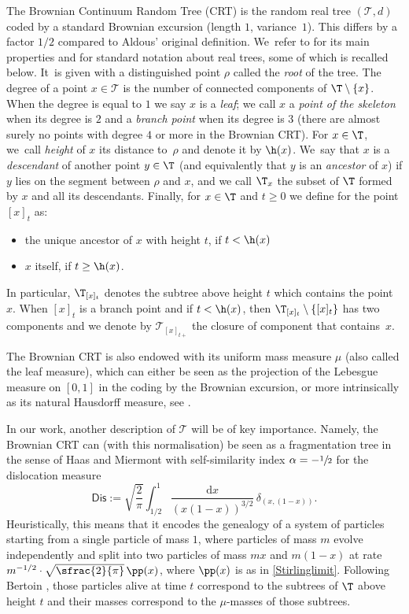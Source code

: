 The Brownian Continuum Random Tree (CRT) is the random real tree $(\mathcal{T}, d)$ coded by a standard Brownian excursion (length $1$, variance~$1$). This differs by a factor $1/2$ compared to Aldous' original definition. We~refer to \cite{LG2005} for its main properties and for standard notation about real trees, some of which is recalled below. It~is given with a distinguished point $ \rho$ called the \emph{root} of the tree. The degree of a point $x \in \mathcal{T}$ is the number of connected components of $\T\setminus \{x\}$. When the degree is equal to $1$ we say $x$ is a \emph{leaf}; we call $x$ a \emph{point of the skeleton} when its degree is $2$ and a \emph{branch point} when its degree is $3$ (there are almost surely no points with degree $4$ or more in the Brownian CRT). For $x\in \T$, we~call \emph{height} of $x$ its distance to~$\rho$ and denote it by $\h(x)$. We~say that $x$ is a \emph{descendant} of another point $y\in\T$ (and equivalently that $y$ is an \emph{ancestor} of $x$) if $y$ lies on the segment between $\rho$ and $x$, and we call $\T_x$ the subset of $\T$ formed by $x$ and all its descendants. Finally, for $x \in \T$ and $t\geq 0$ we define for the point $[x]_t$ as:
\begin{itemize}
\item the unique ancestor of $x$ with height $t$, if $t< \h(x)$
\item $x$ itself, if $t\geq \h(x)$.
\end{itemize}
In particular, $ \T_{[x]_t}$ denotes the subtree above height $t$ which contains the point $x$. When $[x]_t$ is a branch point and if $t < \h(x)$, then $\T_{[x]_t} \setminus \{[x]_t\}$ has two components and we denote by $ \mathcal{T}_{[x]_{t+}}$ the closure of component that contains~$x$.

The Brownian CRT is also endowed with its uniform mass measure $\mu$ (also called the leaf measure), which can either be seen as the projection of the Lebesgue measure on $[0,1]$ in the coding by the Brownian excursion, or more intrinsically as its natural Hausdorff measure, see \cite{duquesne2005probabilistic,duquesne2006hausdorff}.

In our work, another description of $\mathcal{T}$ will be of key importance. Namely, the Brownian CRT can (with this normalisation) be seen as a fragmentation tree in the sense of Haas and Miermont \cite{HM04} with self-similarity index $\alpha = - \sfrac{1}{2}$ for the dislocation measure
\begin{equation}
\label{eq:Dislocation}
\mathsf{Dis} := \sqrt{\frac{2}{\pi}} \int_{1/2}^{1} \frac{ \mathrm{d}x}{(x(1-x))^{3/2}}\, \delta_{(x,(1-x))}.
\end{equation}
Heuristically, this means that it encodes the genealogy of a system of particles starting from a single particle of mass $1$, where particles of mass $m$ evolve independently and split into two particles of mass $mx$ and $m(1-x)$ at rate $m^{-1/2} \cdot \sqrt{\sfrac{2}{\pi}}\, \pp(x)$, where $\pp(x)$ is as in \eqref{Stirlinglimit}. Following Bertoin \cite{bertoin2002self}, those particles alive at time $t$ correspond to the subtrees of $\T$ above height $t$ and their masses correspond to the $\mu$-masses of those subtrees.

